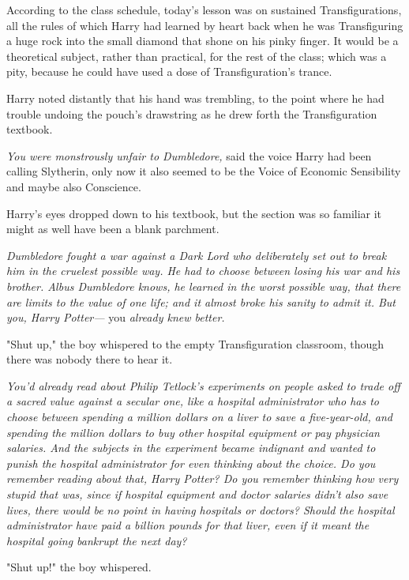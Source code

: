According to the class schedule, today's lesson was on sustained 
Transfigurations, all the rules of which Harry had learned by heart back when 
he was Transfiguring a huge rock into the small diamond that shone on his pinky 
finger. It would be a theoretical subject, rather than practical, for the rest 
of the class; which was a pity, because he could have used a dose of 
Transfiguration's trance.

Harry noted distantly that his hand was trembling, to the point where he had 
trouble undoing the pouch's drawstring as he drew forth the Transfiguration 
textbook.

\emph{You were monstrously unfair to Dumbledore,} said the voice Harry had been 
calling Slytherin, only now it also seemed to be the Voice of Economic 
Sensibility and maybe also Conscience.

Harry's eyes dropped down to his textbook, but the section was so familiar it 
might as well have been a blank parchment.

\emph{Dumbledore fought a war against a Dark Lord who deliberately set out to 
break him in the cruelest possible way. He had to choose between losing his war 
and his brother. Albus Dumbledore knows, he learned in the worst possible way, 
that there are limits to the value of one life; and it almost broke his sanity 
to admit it. But you, Harry Potter---} you\emph{ already knew better.}

"Shut up," the boy whispered to the empty Transfiguration classroom, though 
there was nobody there to hear it.

\emph{You'd already read about Philip Tetlock's experiments on people asked to 
trade off a sacred value against a secular one, like a hospital administrator 
who has to choose between spending a million dollars on a liver to save a 
five-year-old, and spending the million dollars to buy other hospital equipment 
or pay physician salaries. And the subjects in the experiment became indignant 
and wanted to punish the hospital administrator for even thinking about the 
choice. Do you remember reading about that, Harry Potter? Do you remember 
thinking how very stupid that was, since if hospital equipment and doctor 
salaries didn't also save lives, there would be no point in having hospitals or 
doctors? Should the hospital administrator have paid a billion pounds for that 
liver, even if it meant the hospital going bankrupt the next day?}

"Shut up!" the boy whispered.

